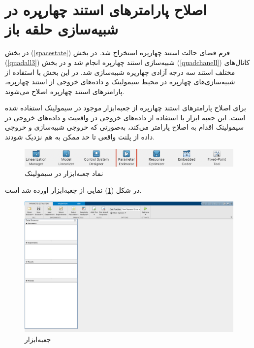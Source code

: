 \section{اصلاح پارامتر‌های  استند چهارپره در شبیه‌سازی حلقه باز}
در بخش
(\ref{spacestate})
فرم فضای حالت استند چهارپره استخراج شد. در بخش
(\ref{quadall3})
شبیه‌سازی استند چهارپره انجام شد و در بخش
(\ref{quadchanell})
کانال‌های مختلف استند سه درجه آزادی چهارپره شبیه‌سازی شد.
در این بخش با استفاده از شبیه‌سازی‌های چهارپره در محیط سیمولینک و داده‌های خروجی  از استند چهارپره، پارامترهای استند چهارپره اصلاح می‌شوند.

برای اصلاح پارامترهای استند چهارپره از جعبه‌ابزار
موجود در سیمولینک
استفاده شده است.
این جعبه ابزار با استفاده از داده‌های خروجی در واقعیت و داده‌های خروجی در سیمولینک اقدام به اصلاح پارامتر می‌کند، به‌صورتی که خروجی شبیه‌سازی و خروجی داده از پلنت واقعی تا حد ممکن به هم نزدیک شودند.



\begin{figure}[H]
	\includegraphics[width=12cm]{../../Figures/QuadSimulation/ParameterEstimation/PS_icon.png}
	\centering
	\caption{نماد جعبه‌ابزار
در سیمولینک}
\end{figure}
در شکل
(\ref{PS})
نمایی از جعبه‌ابزار
 اورده شد است.





\begin{figure}[H]
	\includegraphics[width=12cm]{../../Figures/QuadSimulation/ParameterEstimation/PS_app.png}
	\centering
	\caption{جعبه‌ابزار
	}
	\label{PS}
\end{figure}

